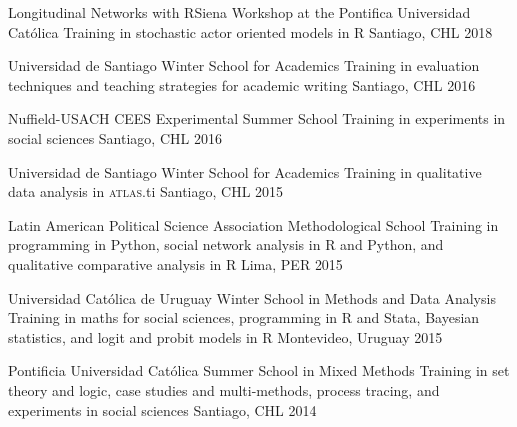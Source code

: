 \vspace{1mm}

\begin{cvhonors}
\cvhonor
{Longitudinal Networks with RSiena Workshop at the Pontifica Universidad Cat\'olica}
{Training in stochastic actor oriented models in R}
{Santiago, CHL}
{2018}
\end{cvhonors}

\vspace{1mm}

\begin{cvhonors}
\cvhonor
{Universidad de Santiago Winter School for Academics}
{Training in evaluation techniques and teaching strategies for academic writing}
{Santiago, CHL}
{2016}
\end{cvhonors}

\vspace{1mm}

\begin{cvhonors}
\cvhonor
{Nuffield-USACH CEES Experimental Summer School}
{Training in experiments in social sciences}
{Santiago, CHL}
{2016}
\end{cvhonors}

\vspace{1mm}

\begin{cvhonors}
\cvhonor
{Universidad de Santiago Winter School for Academics}
{Training in qualitative data analysis in {\scshape atlas}.ti}
{Santiago, CHL}
{2015}
\end{cvhonors}

\vspace{1mm}

\begin{cvhonors}
\cvhonor
{Latin American Political Science Association Methodological School}
{Training in programming in Python, social network analysis in R and Python, and qualitative comparative analysis in R}
{Lima, PER}
{2015}
\end{cvhonors}

\vspace{1mm}

\begin{cvhonors}
\cvhonor
{Universidad Católica de Uruguay Winter School in Methods and Data Analysis}
{Training in maths for social sciences, programming in R and Stata, Bayesian statistics, and logit and probit models in R}
{Montevideo, Uruguay}
{2015}
\end{cvhonors}

\vspace{1mm}

\begin{cvhonors}
\cvhonor
{Pontificia Universidad Católica Summer School in Mixed Methods}
{Training in set theory and logic, case studies and multi-methods, process tracing, and experiments in social sciences}
{Santiago, CHL}
{2014}
\end{cvhonors}

\vspace{1mm}
